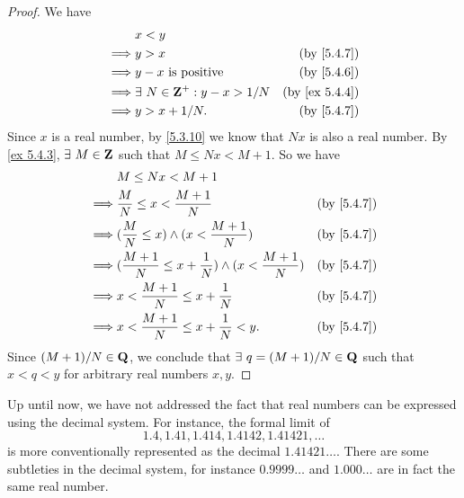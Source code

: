 \begin{proof}
  We have
  \begin{align*}
             & x < y                                                             \\
    \implies & y > x                               & \text{(by \cref{5.4.7})}    \\
    \implies & y - x \text{ is positive}           & \text{(by \cref{5.4.6})}    \\
    \implies & \exists\ N \in \Z^+ : y - x > 1 / N & \text{(by \cref{ex 5.4.4})} \\
    \implies & y > x + 1 / N.                      & \text{(by \cref{5.4.7})}    \\
  \end{align*}
  Since \(x\) is a real number, by \cref{5.3.10} we know that \(Nx\) is also a real number.
  By \cref{ex 5.4.3}, \(\exists\ M \in \mathbf{Z}\) such that \(M \leq Nx < M + 1\).
  So we have
  \begin{align*}
             & M \leq Nx < M + 1                                                                             \\
    \implies & \frac{M}{N} \leq x < \frac{M + 1}{N}                               & \text{(by \cref{5.4.7})} \\
    \implies & (\frac{M}{N} \leq x) \land (x < \frac{M + 1}{N})                   & \text{(by \cref{5.4.7})} \\
    \implies & (\frac{M + 1}{N} \leq x + \frac{1}{N}) \land (x < \frac{M + 1}{N}) & \text{(by \cref{5.4.7})} \\
    \implies & x < \frac{M + 1}{N} \leq x + \frac{1}{N}                           & \text{(by \cref{5.4.7})} \\
    \implies & x < \frac{M + 1}{N} \leq x + \frac{1}{N} < y.                      & \text{(by \cref{5.4.7})}
  \end{align*}
  Since \((M + 1) / N \in \mathbf{Q}\), we conclude that \(\exists\ q = (M + 1) / N \in \mathbf{Q}\) such that \(x < q < y\) for arbitrary real numbers \(x, y\).
\end{proof}

\begin{remark}\label{5.4.15}
  Up until now, we have not addressed the fact that real numbers can be expressed using the decimal system.
  For instance, the formal limit of
  \[
    1.4, 1.41, 1.414, 1.4142, 1.41421, \dots
  \]
  is more conventionally represented as the decimal \(1.41421\dots\).
  There are some subtleties in the decimal system, for instance \(0.9999\dots\) and \(1.000\dots\) are in fact the same real number.
\end{remark}

